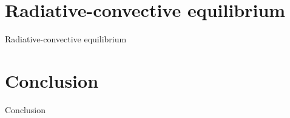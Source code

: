 \documentclass[aspectratio=43]{beamer}
\begin{document}
\section{Radiative-convective equilibrium}
\begin{frame}{Radiative-convective equilibrium}
\end{frame}



\section{Conclusion}
\begin{frame}{Conclusion}
\end{frame}
\end{document}
